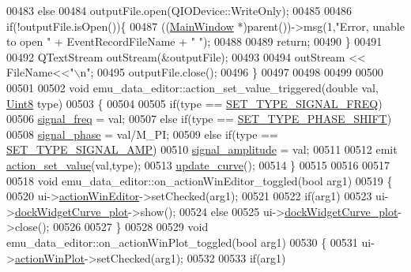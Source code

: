 \begin{DoxyCode}
00483        \textcolor{keywordflow}{else}
00484        outputFile.open(QIODevice::WriteOnly);
00485 
00486        \textcolor{keywordflow}{if}(!outputFile.isOpen())\{
00487            ((\hyperlink{a00006}{MainWindow} *)parent())->msg(1,\textcolor{stringliteral}{"Error, unable to open "} + EventRecordFileName + \textcolor{stringliteral}{" "});
00488 
00489             \textcolor{keywordflow}{return};
00490        \}
00491 
00492        QTextStream outStream(&outputFile);
00493 
00494        outStream << FileName<<\textcolor{stringliteral}{"\(\backslash\)n"};
00495        outputFile.close();
00496 \}
00497 
00498 
00499 
00500 
00501 
00502 \textcolor{keywordtype}{void} emu\_data\_editor::action\_set\_value\_triggered(\textcolor{keywordtype}{double} val, \hyperlink{a00001_a979e3e23b9a449e69ab6a8a83b6042f8}{Uint8} type)
00503 \{
00504 
00505     \textcolor{keywordflow}{if}(type == \hyperlink{a00034_ac1c2065e42f20c51064c84c0db23e9f5}{SET\_TYPE\_SIGNAL\_FREQ})
00506         \hyperlink{a00004_a67039999d520fc483fab521fae5ddde4}{signal\_freq} = val;
00507     \textcolor{keywordflow}{else} \textcolor{keywordflow}{if}(type == \hyperlink{a00034_ada31d976cd5e22a05ba8ff5e80c16d06}{SET\_TYPE\_PHASE\_SHIFT})
00508         \hyperlink{a00004_af08de88fdfe283086e3cca97a2965678}{signal\_phase} = val/M\_PI;
00509     \textcolor{keywordflow}{else} \textcolor{keywordflow}{if}(type == \hyperlink{a00034_a32500d8cf5fb09339cc8f97d52206b41}{SET\_TYPE\_SIGNAL\_AMP})
00510         \hyperlink{a00004_a73dabe63bd74afe2776e8136211dc36e}{signal\_amplitude} = val;
00511 
00512     emit \hyperlink{a00004_a7c1fa0d7d1623b11d4badceb1854010e}{action\_set\_value}(val,type);
00513     \hyperlink{a00004_a15cbcf5f0a17281468800f47898f60c1}{update\_curve}();
00514 \}
00515 
00516 
00517 
00518 \textcolor{keywordtype}{void} emu\_data\_editor::on\_actionWinEditor\_toggled(\textcolor{keywordtype}{bool} arg1)
00519 \{
00520      ui->\hyperlink{a00026_aa5d56420958ab4fd1239e29714d75e18}{actionWinEditor}->setChecked(arg1);
00521 
00522      \textcolor{keywordflow}{if}(arg1)
00523          ui->\hyperlink{a00026_a0edc87fb115fede171c0da1f99000874}{dockWidgetCurve\_plot}->show();
00524      \textcolor{keywordflow}{else}
00525          ui->\hyperlink{a00026_a0edc87fb115fede171c0da1f99000874}{dockWidgetCurve\_plot}->close();
00526 
00527 \}
00528 
00529 \textcolor{keywordtype}{void} emu\_data\_editor::on\_actionWinPlot\_toggled(\textcolor{keywordtype}{bool} arg1)
00530 \{
00531      ui->\hyperlink{a00026_a0aeb289d8df9db6f4329e9000e44d511}{actionWinPlot}->setChecked(arg1);
00532 
00533      \textcolor{keywordflow}{if}(arg1)

\end{DoxyCode}
